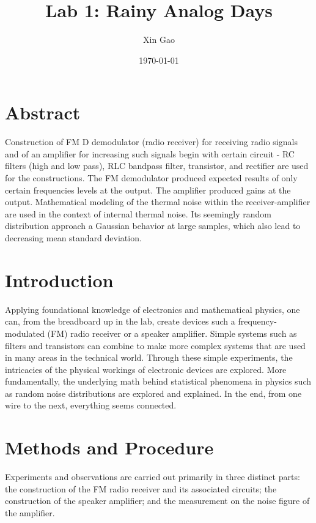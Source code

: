 \documentclass[12pt]{article}
\title{Lab 1: Rainy Analog Days}
\author{Xin Gao}
\date{\today}
\begin{document}
\maketitle
\section{Abstract}
Construction of FM D demodulator (radio receiver) for receiving radio signals and of an
amplifier for increasing such signals begin with certain circuit - RC
filters (high and low pass), RLC bandpass filter, transistor, and
rectifier are used for the constructions. The FM demodulator produced
expected results of only certain frequencies levels at the output. The
amplifier produced gains at the output. Mathematical modeling of the
thermal noise within the receiver-amplifier are used in the context of
internal thermal noise. Its seemingly random distribution approach a
Gaussian behavior at large samples, which also lead to decreasing mean
standard deviation. 


\section{Introduction}
Applying foundational knowledge of electronics and
mathematical physics, one can, from the breadboard up in the lab, create devices such a
frequency-modulated (FM) radio receiver or a speaker amplifier. Simple
systems such as filters and transistors can combine to make more
complex systems that are used in many areas in the technical
world. Through these simple experiments, the intricacies of the physical
workings of electronic devices are explored. More fundamentally, the
underlying math behind statistical phenomena in physics such as random noise
distributions are explored and explained. In the end, from one wire
to the next, everything seems connected.

\section{Methods and Procedure}
Experiments and observations are carried out primarily in three
distinct parts: the construction of the FM radio receiver and its
associated circuits; the construction of the speaker amplifier; and the
measurement on the noise figure of the amplifier.
\end{document}
